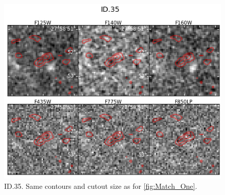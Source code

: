 \begin{figure}[tbp]
\centering \includegraphics[width=160mm]{Matched/ASPECS_Cutout_34.jpg}
\caption{ID.35. Same contours and cutout size as for \ref{fig:Match_One}.}
\label{fig:Match_Three}
\end{figure}

